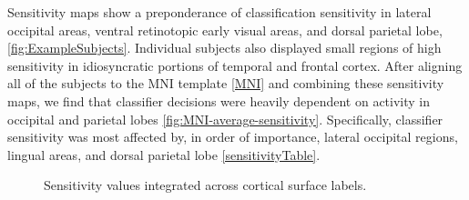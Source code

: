 \documentclass[preprint,5p,authoryear]{elsarticle}
\begin{document}
Sensitivity maps show a preponderance of classification sensitivity in lateral occipital areas, ventral retinotopic early visual areas, and dorsal parietal lobe, \ref{fig:ExampleSubjects}. 
Individual subjects also displayed small regions of high sensitivity in idiosyncratic portions of temporal and frontal cortex. 
After aligning all of the subjects to the MNI template \ref{MNI} and combining these sensitivity maps, we find that classifier decisions were heavily dependent on activity in occipital and parietal lobes \ref{fig:MNI-average-sensitivity}.  
Specifically, classifier sensitivity was most affected by, in order of importance, lateral occipital regions, lingual areas, and dorsal parietal lobe  \ref{sensitivityTable}. 

\begin{figure}
\centering

\caption{Sensitivity values integrated across cortical surface labels.}
\label{tab:full-sensitivity}
\end{figure}
\end{document}
